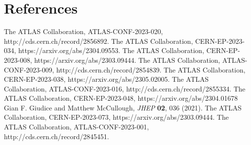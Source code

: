 \documentclass{moriond}
\def\Journal#1#2#3#4{{#1} {\bf #2}, #3 (#4)}
\def\JHEP{\em JHEP}
\begin{document}
\section*{References}

\begin{thebibliography}{99}

 The ATLAS Collaboration, ATLAS-CONF-2023-020, http://cds.cern.ch/record/2856892.
 The ATLAS Collaboration, CERN-EP-2023-034, https://arxiv.org/abs/2304.09553.
 The ATLAS Collaboration, CERN-EP-2023-008, https://arxiv.org/abs/2303.09444.
 The ATLAS Collaboration, ATLAS-CONF-2023-009, http://cds.cern.ch/record/2854839.
 The ATLAS Collaboration, CERN-EP-2023-038, https://arxiv.org/abs/2305.02005.
 The ATLAS Collaboration, ATLAS-CONF-2023-016, http://cds.cern.ch/record/2855334.
 The ATLAS Collaboration, CERN-EP-2023-048, https://arxiv.org/abs/2304.01678
 Gian F. Giudice and Matthew McCullough, \Journal{\JHEP}{02}{036}{2021}.
 The ATLAS Collaboration, CERN-EP-2023-073, https://arxiv.org/abs/2303.09444.
 The ATLAS Collaboration, ATLAS-CONF-2023-001, http://cds.cern.ch/record/2845451.

\end{thebibliography}
\end{document}
